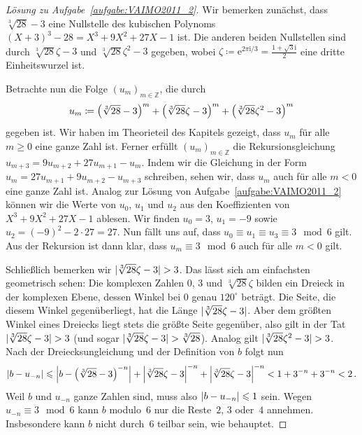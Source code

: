 \begin{proof}[Lösung zu Aufgabe~\ref{aufgabe:VAIMO2011_2}]
	Wir bemerken zunächst, dass $\sqrt[3]{28}-3$ eine Nullstelle des kubischen Polynoms $(X+3)^3-28=X^3+9X^2+27X-1$ ist. Die anderen beiden Nullstellen sind durch $\sqrt[3]{28}\zeta-3$ und $\sqrt[3]{28}\zeta^2-3$ gegeben, wobei $\zeta\coloneqq \mathrm{e}^{2\pi\mathrm{i}/3}=\frac{1+\sqrt{3}\mathrm{i}}{2}$ eine dritte Einheitswurzel ist.
	
	Betrachte nun die Folge $(u_m)_{m\in\mathbb Z}$, die durch
	\begin{equation*}
		u_m\coloneqq \parens*{\sqrt[3]{28}-3}^m+\parens*{\sqrt[3]{28}\zeta-3}^m+\parens*{\sqrt[3]{28}\zeta^2-3}^m
	\end{equation*}
	gegeben ist. Wir haben im Theorieteil des Kapitels gezeigt, dass $u_m$ für alle $m\geqslant 0$ eine ganze Zahl ist. Ferner erfüllt $(u_m)_{m\in\mathbb Z}$ die Rekursionsgleichung $u_{m+3}=9u_{m+2}+27u_{m+1}-u_m$. Indem wir die Gleichung in der Form $u_{m}=27u_{m+1}+9u_{m+2}-u_{m+3}$ schreiben, sehen wir, dass $u_m$ auch für alle $m<0$ eine ganze Zahl ist. Analog zur Lösung von Aufgabe~\ref{aufgabe:VAIMO2011_2} können wir die Werte von $u_0$, $u_1$ und $u_2$ aus den Koeffizienten von $X^3+9X^2+27X-1$ ablesen. Wir finden $u_0=3$, $u_1=-9$ sowie $u_2=(-9)^2-2\cdot 27=27$. Nun fällt uns auf, dass $u_0\equiv u_1\equiv u_3\equiv 3\mod 6$ gilt. Aus der Rekursion ist dann klar, dass $u_m\equiv 3\mod 6$ auch für alle $m<0$ gilt.
	
	Schließlich bemerken wir $\abs{\sqrt[3]{28}\zeta-3}>3$. Das lässt sich am einfachsten geometrisch sehen: Die komplexen Zahlen $0$, $3$ und $\sqrt[3]{28}\zeta$ bilden ein Dreieck in der komplexen Ebene, dessen Winkel bei $0$ genau $120^\circ$ beträgt. Die Seite, die diesem Winkel gegenüberliegt, hat die Länge $\abs{\sqrt[3]{28}\zeta-3}$. Aber dem größten Winkel eines Dreiecks liegt stets die größte Seite gegenüber, also gilt in der Tat $\abs{\sqrt[3]{28}\zeta-3}>3$ (und sogar $\abs{\sqrt[3]{28}\zeta-3}>\sqrt[3]{28}$). Analog gilt $\abs{\sqrt[3]{28}\zeta^2-3}>3$. Nach der Dreiecksungleichung und der Definition von $b$ folgt nun
	\begin{equation*}
		\abs*{b-u_{-n}}\leqslant \abs[\Big]{b-\parens*{\sqrt[3]{28}-3}^{-n}}+\abs*{\sqrt[3]{28}\zeta-3}^{-n}+\abs*{\sqrt[3]{28}\zeta-3}^{-n}<1+3^{-n}+3^{-n}<2\,.
	\end{equation*}
	Weil $b$ und $u_{-n}$ ganze Zahlen sind, muss also $\abs*{b-u_{-n}}\leqslant 1$ sein. Wegen $u_{-n}\equiv 3\mod 6$ kann $b$ modulo~$6$ nur die Reste~$2$, $3$ oder~$4$ annehmen. Insbesondere kann $b$ nicht durch~$6$ teilbar sein, wie behauptet.
\end{proof}